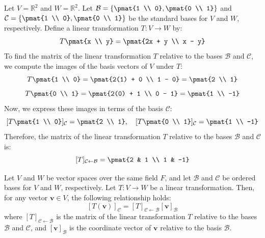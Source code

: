 \documentclass[openany]{book}
\begin{document}
\begin{example}
    Let $V = \mathbb{R}^2$ and $W = \mathbb{R}^2$. Let $\mathcal{B} = \left\{\pmat{1 \\ 0}, \pmat{0 \\ 1}\right\}$ and $\mathcal{C} = \left\{\pmat{1 \\ 0}, \pmat{0 \\ 1}\right\}$ be the standard bases for $V$ and $W$, respectively. Define a linear transformation $T: V \to W$ by:
    $$T\pmat{x \\ y} = \pmat{2x + y \\ x - y}$$
    To find the matrix of the linear transformation $T$ relative to the bases $\mathcal{B}$ and $\mathcal{C}$, we compute the images of the basis vectors of $V$ under $T$:
    \[
    T\pmat{1 \\ 0} = \pmat{2(1) + 0 \\ 1 - 0} = \pmat{2 \\ 1}
    \]
    \[
    T\pmat{0 \\ 1} = \pmat{2(0) + 1 \\ 0 - 1} = \pmat{1 \\ -1}
    \]
    Now, we express these images in terms of the basis $\mathcal{C}$:
    \[
    [T\pmat{1 \\ 0}]_{\mathcal{C}} = \pmat{2 \\ 1}, \quad [T\pmat{0 \\ 1}]_{\mathcal{C}} = \pmat{1 \\ -1}
    \]
    Therefore, the matrix of the linear transformation $T$ relative to the bases $\mathcal{B}$ and $\mathcal{C}$ is:
    \[
    [T]_{\mathcal{C} \leftarrow \mathcal{B}} = \pmat{2 & 1 \\ 1 & -1}
    \]
\end{example}
\begin{mytheorem}
    Let $V$ and $W$ be vector spaces over the same field $F$, and let $\mathcal{B}$ and $\mathcal{C}$ be ordered bases for $V$ and $W$, respectively. Let $T: V \to W$ be a linear transformation. Then, for any vector $\mathbf{v} \in V$, the following relationship holds:
    $$[T(\mathbf{v})]_{\mathcal{C}} = [T]_{\mathcal{C} \leftarrow \mathcal{B}} [\mathbf{v}]_{\mathcal{B}}$$
    where $[T]_{\mathcal{C} \leftarrow \mathcal{B}}$ is the matrix of the linear transformation $T$ relative to the bases $\mathcal{B}$ and $\mathcal{C}$, and $[\mathbf{v}]_{\mathcal{B}}$ is the coordinate vector of $\mathbf{v}$ relative to the basis $\mathcal{B}$.
\end{mytheorem}
\end{document}
